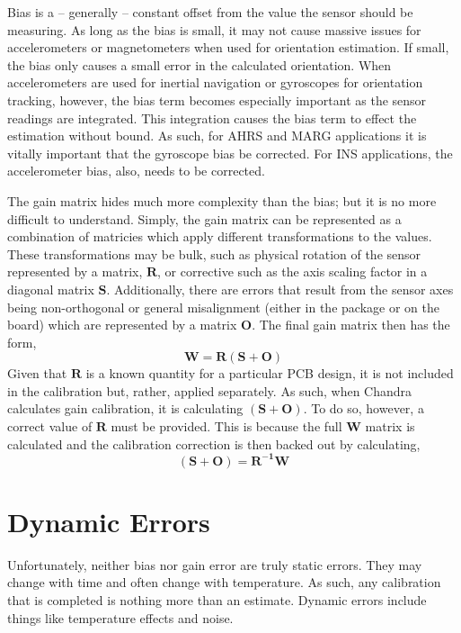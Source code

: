 \documentclass[10pt,letterpaper]{memoir} %
\begin{document}
Bias is a -- generally -- constant offset from the value the sensor should be measuring.  As long as the bias is small, it may not cause massive issues for accelerometers or magnetometers when used for orientation estimation.  If small, the bias only causes a small error in the calculated orientation.  When accelerometers are used for inertial navigation or gyroscopes for orientation tracking, however, the bias term becomes especially important as the sensor readings are integrated.  This integration causes the bias term to effect the estimation without bound.  As such, for AHRS and MARG applications it is vitally important that the gyroscope bias be corrected.  For INS applications, the accelerometer bias, also, needs to be corrected.

The gain matrix hides much more complexity than the bias; but it is no more difficult to understand.  Simply, the gain matrix can be represented as a combination of matricies which apply different transformations to the values.  These transformations may be bulk, such as physical rotation of the sensor represented by a matrix, $\mathbf{R}$, or corrective such as the axis scaling factor in a diagonal matrix $\mathbf{S}$.  Additionally, there are errors that result from the sensor axes being non-orthogonal or general misalignment (either in the package or on the board) which are represented by a matrix $\mathbf{O}$.  The final gain matrix then has the form,
\begin{equation}
	\mathbf{W} = \mathbf{R}(\mathbf{S}+\mathbf{O})
\end{equation}
Given that $\mathbf{R}$ is a known quantity for a particular PCB design, it is not included in the calibration but, rather, applied separately.  As such, when Chandra calculates gain calibration, it is calculating $(\mathbf{S}+\mathbf{O})$.  To do so, however, a correct value of $\mathbf{R}$ must be provided.  This is because the full $\mathbf{W}$ matrix is calculated and the calibration correction is then backed out by calculating,
\begin{equation}
	(\mathbf{S}+\mathbf{O}) = \mathbf{R^{-1}}\mathbf{W}
\end{equation}


\section{Dynamic Errors}
Unfortunately, neither bias nor gain error are truly static errors.  They may change with time and often change with temperature.  As such, any calibration that is completed is nothing more than an estimate.  Dynamic errors include things like temperature effects and noise.  
\end{document}

